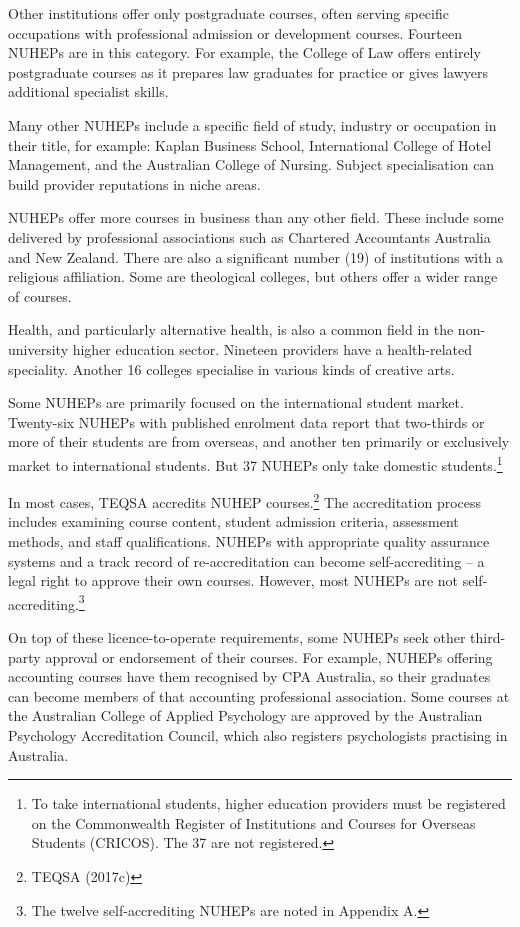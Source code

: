\documentclass{grattan}
\begin{document}
Other institutions offer only postgraduate courses, often serving specific occupations with professional admission or development courses. Fourteen NUHEPs are in this category. For example, the College of Law offers entirely postgraduate courses as it prepares law graduates for practice or gives lawyers additional specialist skills.

Many other NUHEPs include a specific field of study, industry or occupation in their title, for example: Kaplan Business School, International College of Hotel Management, and the Australian College of Nursing. Subject specialisation can build provider reputations in niche areas.

NUHEPs offer more courses in business than any other field. These include some delivered by professional associations such as Chartered Accountants Australia and New Zealand. There are also a significant number (19) of institutions with a religious affiliation. Some are theological colleges, but others offer a wider range of courses.

Health, and particularly alternative health, is also a common field in the non-university higher education sector. Nineteen providers have a health-related speciality. Another 16 colleges specialise in various kinds of creative arts.

Some NUHEPs are primarily focused on the international student market. Twenty-six NUHEPs with published enrolment data report that two-thirds or more of their students are from overseas, and another ten primarily or exclusively market to international students. But 37 NUHEPs only take domestic students.\footnote{To take international students, higher education providers must be registered on the Commonwealth Register of Institutions and Courses for Overseas Students (CRICOS). The 37 are not registered.}

In most cases, TEQSA accredits NUHEP courses.\footnote{TEQSA (2017c)} The accreditation process includes examining course content, student admission criteria, assessment methods, and staff qualifications. NUHEPs with appropriate quality assurance systems and a track record of re-accreditation can become self-accrediting -- a legal right to approve their own courses. However, most NUHEPs are not self-accrediting.\footnote{The twelve self-accrediting NUHEPs are noted in Appendix A.}

On top of these licence-to-operate requirements, some NUHEPs seek other third-party approval or endorsement of their courses. For example, NUHEPs offering accounting courses have them recognised by CPA Australia, so their graduates can become members of that accounting professional association. Some courses at the Australian College of Applied Psychology are approved by the Australian Psychology Accreditation Council, which also registers psychologists practising in Australia.
\end{document}
